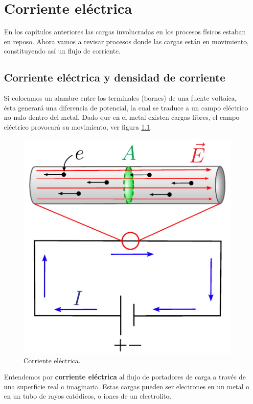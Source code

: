 \chapter{Corriente eléctrica}

En los capítulos anteriores las cargas involucradas en los procesos físicos estaban en reposo. Ahora vamos a revisar procesos donde las cargas están en movimiento, constituyendo así un flujo de corriente.

\section{Corriente eléctrica y densidad de corriente}

Si colocamos un alambre entre los terminales (bornes) de una fuente voltaica, ésta generará una diferencia de potencial, la cual se traduce a un  campo eléctrico no nulo dentro del metal. Dado que en el metal existen cargas libres, el campo eléctrico provocará su movimiento, ver figura \ref{fig:Corriente-Electrica}.
 
\begin{figure}[H]
    \centering
    \includegraphics[scale = 0.9]{Figuras/Corriente-Electrica.pdf}
    \caption{Corriente eléctrica.}
    \label{fig:Corriente-Electrica}
\end{figure}

Entendemos por \textbf{corriente eléctrica} al flujo de portadores de carga a través de una superficie real o imaginaria. Estas cargas pueden ser electrones en un metal o en un tubo de rayos catódicos, o iones de un electrolito.

